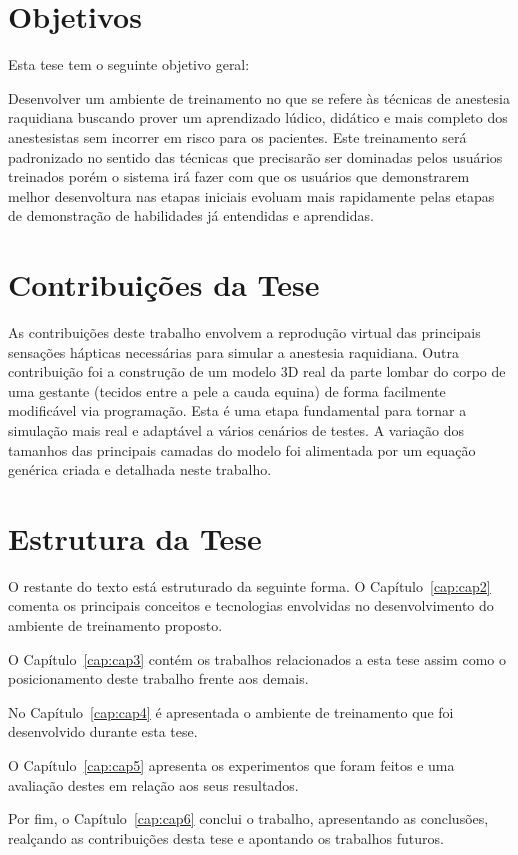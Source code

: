 \section{Objetivos}
\label{sec:objetivos}

Esta tese tem o seguinte objetivo geral:

Desenvolver um ambiente de treinamento no que se refere às técnicas de anestesia raquidiana buscando prover um aprendizado lúdico, didático e mais completo dos anestesistas sem incorrer em risco para os pacientes. Este treinamento será padronizado no sentido das técnicas que precisarão ser dominadas pelos usuários treinados porém o sistema irá fazer com que os usuários que demonstrarem melhor desenvoltura nas etapas iniciais evoluam mais rapidamente pelas etapas de demonstração de habilidades já entendidas e aprendidas. 

\section{Contribuições da Tese}
\label{sec:contribuicoes}

As contribuições deste trabalho envolvem a reprodução virtual das principais sensações hápticas necessárias para simular a anestesia raquidiana. Outra contribuição foi a construção de um modelo 3D real da parte lombar do corpo de uma gestante (tecidos entre a pele a cauda equina) de forma facilmente modificável via programação. Esta é uma etapa fundamental para tornar a simulação mais real e adaptável a vários cenários de testes. A variação dos tamanhos das principais camadas do modelo foi alimentada por um equação genérica criada e detalhada neste trabalho.

\section{Estrutura da Tese}
\label{sec:estrutura}

O restante do texto está estruturado da seguinte forma. O Capítulo~\ref{cap:cap2} comenta os principais conceitos e tecnologias envolvidas no desenvolvimento do ambiente de treinamento proposto.

O Capítulo~\ref{cap:cap3} contém os trabalhos relacionados a esta tese assim como o posicionamento deste trabalho frente aos demais.

No Capítulo~\ref{cap:cap4} é apresentada o ambiente de treinamento que foi desenvolvido durante esta tese. 

O Capítulo~\ref{cap:cap5} apresenta os experimentos que foram feitos e uma avaliação destes em relação aos seus resultados.

Por fim, o Capítulo~\ref{cap:cap6} conclui o trabalho, apresentando as conclusões, realçando as contribuições desta tese e apontando os  trabalhos futuros.


